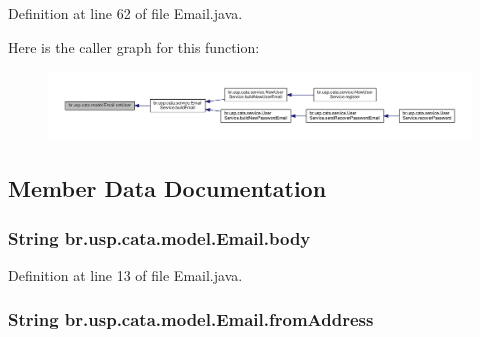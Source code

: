 Definition at line 62 of file Email.\+java.



Here is the caller graph for this function\+:\nopagebreak
\begin{figure}[H]
\begin{center}
\leavevmode
\includegraphics[width=350pt]{classbr_1_1usp_1_1cata_1_1model_1_1_email_a06889f561b79ed20f28ecfdb791afe57_icgraph}
\end{center}
\end{figure}




\subsection{Member Data Documentation}
\hypertarget{classbr_1_1usp_1_1cata_1_1model_1_1_email_a4bd8b5c8a814752d6f98a01bd231a37b}{
\subsubsection[{body}]{\setlength{\rightskip}{0pt plus 5cm}String br.\+usp.\+cata.\+model.\+Email.\+body\hspace{0.3cm}{\ttfamily [private]}}}\label{classbr_1_1usp_1_1cata_1_1model_1_1_email_a4bd8b5c8a814752d6f98a01bd231a37b}


Definition at line 13 of file Email.\+java.

\hypertarget{classbr_1_1usp_1_1cata_1_1model_1_1_email_ac14d376423021153643da3fb9fb71153}{
\subsubsection[{from\+Address}]{\setlength{\rightskip}{0pt plus 5cm}String br.\+usp.\+cata.\+model.\+Email.\+from\+Address\hspace{0.3cm}{\ttfamily [private]}}}\label{classbr_1_1usp_1_1cata_1_1model_1_1_email_ac14d376423021153643da3fb9fb71153}


